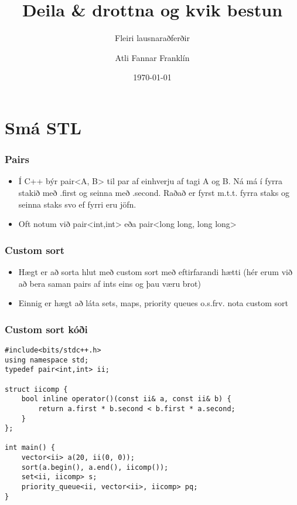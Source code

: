 \documentclass{beamer}
\title{Deila \& drottna og kvik bestun}
\subtitle{Fleiri lausnaraðferðir}
\author{Atli Fannar Franklín}
\date{\today}
\begin{document}
\frame{\titlepage}

\section[Smá STL]{Smá STL}

\begin{frame}
\frametitle{Pairs}

\begin{itemize}

\item<1-> Í C++ býr pair<A, B> til par af einhverju af tagi A og B. Ná má í fyrra stakið með .first og seinna með .second. Raðað er fyrst m.t.t. fyrra staks og seinna staks svo ef fyrri eru jöfn.

\item<2-> Oft notum við pair<int,int> eða pair<long long, long long>

\end{itemize}

\end{frame}

\begin{frame}[fragile]
\frametitle{Custom sort}

\begin{itemize}

\item<1-> Hægt er að sorta hlut með custom sort með eftirfarandi hætti (hér erum við að bera saman pairs af ints eins og þau væru brot)

\item<2-> Einnig er hægt að láta sets, maps, priority queues o.s.frv. nota custom sort

\end{itemize}

\end{frame}

\begin{frame}[fragile]
\frametitle{Custom sort kóði}

\begin{verbatim}
#include<bits/stdc++.h>
using namespace std;
typedef pair<int,int> ii;

struct iicomp {
    bool inline operator()(const ii& a, const ii& b) {
        return a.first * b.second < b.first * a.second;
    }
}; 

int main() {
	vector<ii> a(20, ii(0, 0));
	sort(a.begin(), a.end(), iicomp());
	set<ii, iicomp> s;
	priority_queue<ii, vector<ii>, iicomp> pq;
}
\end{verbatim}

\end{frame}
\end{document}

